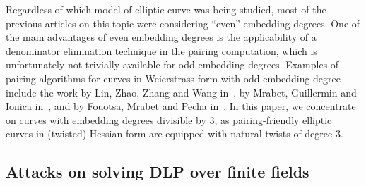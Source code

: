 Regardless of which model of elliptic curve was being studied,
most of the previous articles on this topic were considering ``even'' embedding degrees.
One of the main advantages of even embedding degrees is the applicability of a denominator elimination technique in the pairing computation,
which is unfortunately not trivially available for odd embedding degrees.
Examples of pairing algorithms for curves in Weierstrass form with odd embedding degree include
the work by Lin, Zhao, Zhang and Wang in~\cite{2008/lin}, by Mrabet, Guillermin and Ionica in~\cite{2009/deg15},
and by Fouotsa, Mrabet and Pecha in~\cite{2016/degodd}.
In this paper, we concentrate on curves with embedding degrees divisible by 3,
as pairing-friendly elliptic curves in (twisted) Hessian form are equipped with natural twists of degree 3.





\subsection{Attacks on solving DLP over finite fields}

